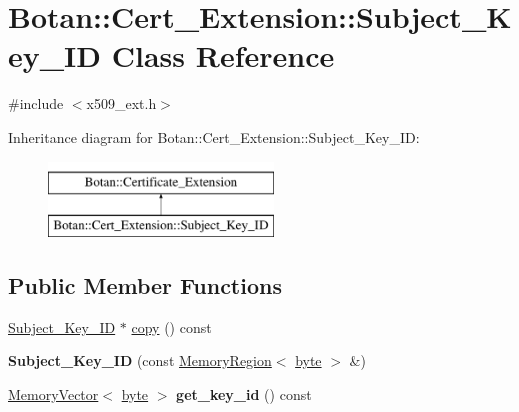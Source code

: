 \hypertarget{classBotan_1_1Cert__Extension_1_1Subject__Key__ID}{\section{Botan\-:\-:Cert\-\_\-\-Extension\-:\-:Subject\-\_\-\-Key\-\_\-\-I\-D Class Reference}
\label{classBotan_1_1Cert__Extension_1_1Subject__Key__ID}
}


{\ttfamily \#include $<$x509\-\_\-ext.\-h$>$}

Inheritance diagram for Botan\-:\-:Cert\-\_\-\-Extension\-:\-:Subject\-\_\-\-Key\-\_\-\-I\-D\-:\begin{figure}[H]
\begin{center}
\leavevmode
\includegraphics[height=2.000000cm]{classBotan_1_1Cert__Extension_1_1Subject__Key__ID}
\end{center}
\end{figure}
\subsection*{Public Member Functions}
\begin{DoxyCompactItemize}
\item 
\hyperlink{classBotan_1_1Cert__Extension_1_1Subject__Key__ID}{Subject\-\_\-\-Key\-\_\-\-I\-D} $\ast$ \hyperlink{classBotan_1_1Cert__Extension_1_1Subject__Key__ID_a3e1bb9c1a1480af24427bc9d698ba750}{copy} () const 
\item 
\hypertarget{classBotan_1_1Cert__Extension_1_1Subject__Key__ID_a123a1e6f807c77bd4532261cbac7a4e9}{{\bfseries Subject\-\_\-\-Key\-\_\-\-I\-D} (const \hyperlink{classBotan_1_1MemoryRegion}{Memory\-Region}$<$ \hyperlink{namespaceBotan_a7d793989d801281df48c6b19616b8b84}{byte} $>$ \&)}\label{classBotan_1_1Cert__Extension_1_1Subject__Key__ID_a123a1e6f807c77bd4532261cbac7a4e9}

\item 
\hypertarget{classBotan_1_1Cert__Extension_1_1Subject__Key__ID_acf8c6e97e3019e37b7699184be90f572}{\hyperlink{classBotan_1_1MemoryVector}{Memory\-Vector}$<$ \hyperlink{namespaceBotan_a7d793989d801281df48c6b19616b8b84}{byte} $>$ {\bfseries get\-\_\-key\-\_\-id} () const }\label{classBotan_1_1Cert__Extension_1_1Subject__Key__ID_acf8c6e97e3019e37b7699184be90f572}

\end{DoxyCompactItemize}


